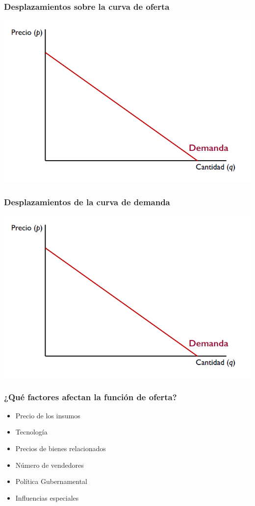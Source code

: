 \documentclass{beamer}
\begin{document}
\begin{frame}
\frametitle{Desplazamientos sobre la curva de oferta}
\includegraphics[scale=0.6]{../Figures/Tema_07.1_curvadeldemanda.png}
\end{frame}

\begin{frame}
\frametitle{Desplazamientos de la curva de demanda}
\includegraphics[scale=0.6]{../Figures/Tema_07.1_curvadeldemanda.png}
\end{frame}

\begin{frame}
\frametitle{¿Qué factores afectan la función de oferta?}
\begin{itemize}
    \item Precio de los insumos %
    \item Tecnología %
    \item Precios de bienes relacionados %
    \item Número de vendedores %
    \item Política Gubernamental %
    \item Influencias especiales %
\end{itemize}
\end{frame}
\end{document}
